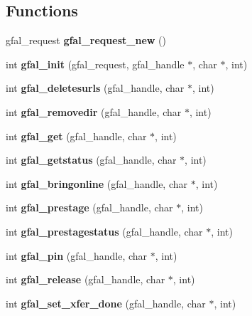 \subsection*{Functions}
\begin{CompactItemize}
\item 
gfal\_\-request \textbf{gfal\_\-request\_\-new} ()\label{gfal__common_8h_b5d503849656335232e56583b376ee22}

\item 
int \textbf{gfal\_\-init} (gfal\_\-request, gfal\_\-handle $\ast$, char $\ast$, int)\label{gfal__common_8h_6a6a376acadfe02f8b8fdd07d0d19dd1}

\item 
int \textbf{gfal\_\-deletesurls} (gfal\_\-handle, char $\ast$, int)\label{gfal__common_8h_5e5a84f63eaa3bf2bb079e9f2eb26206}

\item 
int \textbf{gfal\_\-removedir} (gfal\_\-handle, char $\ast$, int)\label{gfal__common_8h_0a50e7e9c9f23b0f3272d104ae69daee}

\item 
int \textbf{gfal\_\-get} (gfal\_\-handle, char $\ast$, int)\label{gfal__common_8h_5a11900a104a51b955944379c7397db1}

\item 
int \textbf{gfal\_\-getstatus} (gfal\_\-handle, char $\ast$, int)\label{gfal__common_8h_8fe0e87610c1221796a3d10d2cf4816e}

\item 
int \textbf{gfal\_\-bringonline} (gfal\_\-handle, char $\ast$, int)\label{gfal__common_8h_4eb3771f917c71fee4cc06d925a19322}

\item 
int \textbf{gfal\_\-prestage} (gfal\_\-handle, char $\ast$, int)\label{gfal__common_8h_17c188741a1d8f6db0cfbe22ef2c402f}

\item 
int \textbf{gfal\_\-prestagestatus} (gfal\_\-handle, char $\ast$, int)\label{gfal__common_8h_ae17e3249e7ab47bfcbb4bbfb0e6da6c}

\item 
int \textbf{gfal\_\-pin} (gfal\_\-handle, char $\ast$, int)\label{gfal__common_8h_9764581af9643f6d3f014b2bc9d5c4ac}

\item 
int \textbf{gfal\_\-release} (gfal\_\-handle, char $\ast$, int)\label{gfal__common_8h_d67e1b55d16fbcc9c02e0ab44bbed7bd}

\item 
int \textbf{gfal\_\-set\_\-xfer\_\-done} (gfal\_\-handle, char $\ast$, int)\label{gfal__common_8h_0dd3f7181d48d5311146106ec2eaba8a}


\end{CompactItemize}
